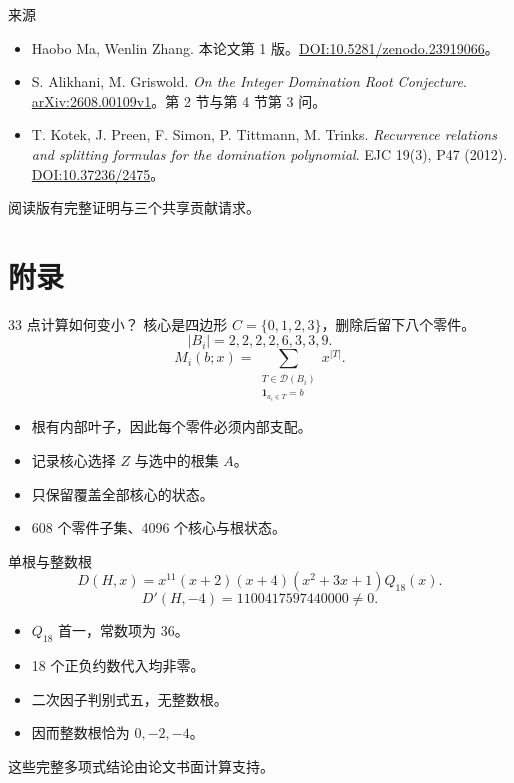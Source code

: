 \documentclass{beamer}
\begin{document}
\begin{frame}{来源}
\small
\begin{itemize}
\item Haobo Ma, Wenlin Zhang. 本论文第 1 版。\href{https://doi.org/10.5281/zenodo.23919066}{DOI:10.5281/zenodo.23919066}。
\item S. Alikhani, M. Griswold. \emph{On the Integer Domination Root Conjecture}. \href{https://arxiv.org/abs/2608.00109v1}{arXiv:2608.00109v1}。第 2 节与第 4 节第 3 问。
\item T. Kotek, J. Preen, F. Simon, P. Tittmann, M. Trinks. \emph{Recurrence relations and splitting formulas for the domination polynomial}. EJC 19(3), P47 (2012). \href{https://doi.org/10.37236/2475}{DOI:10.37236/2475}。
\end{itemize}
\normalsize 阅读版有完整证明与三个共享贡献请求。
\end{frame}
\appendix
\section{附录}
\begin{frame}{33 点计算如何变小？}
核心是四边形 $C=\{0,1,2,3\}$，删除后留下八个零件。
\[|B_i|=2,2,2,2,6,3,3,9.\]
\[M_i(b;x)=\sum_{\substack{T\in\mathcal D(B_i)\\\boldsymbol1_{a_i\in T}=b}}x^{|T|}.\]
\begin{itemize}
\item 根有内部叶子，因此每个零件必须内部支配。
\item 记录核心选择 $Z$ 与选中的根集 $A$。
\item 只保留覆盖全部核心的状态。
\item 608 个零件子集、4096 个核心与根状态。
\end{itemize}
\end{frame}
\begin{frame}{单根与整数根}
\[D(H,x)=x^{11}(x+2)(x+4)(x^2+3x+1)Q_{18}(x).\]
\[D'(H,-4)=1100417597440000\ne0.\]
\begin{itemize}
\item $Q_{18}$ 首一，常数项为 36。
\item 18 个正负约数代入均非零。
\item 二次因子判别式五，无整数根。
\item 因而整数根恰为 $0,-2,-4$。
\end{itemize}
这些完整多项式结论由论文书面计算支持。
\end{frame}
\FormalVerification
\end{document}
